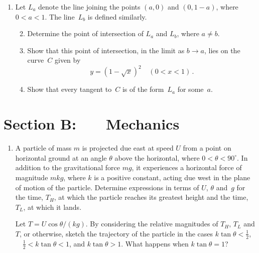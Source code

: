 \documentclass[a4, 11pt]{report}
\newlength{\qspace}
\newcounter{qnumber}
\newenvironment{question}%
 {\vspace{\qspace}
  \begin{enumerate}[\bfseries 1\quad][10]%
    \setcounter{enumi}{\value{qnumber}}%
    \item%
 }
{
  \end{enumerate}
  \filbreak
  \stepcounter{qnumber}
 }
\newenvironment{questionparts}[1][1]%
 {
  \begin{enumerate}[\bfseries (i)]%
    \setcounter{enumii}{#1}
    \addtocounter{enumii}{-1}
    \setlength{\itemsep}{5mm}
    \setlength{\parskip}{8pt}
 }
 {
  \end{enumerate}
 }
\renewcommand{\.}[1]{\ensuremath{\mathrm{#1}}}
\newcommand{\+}[1]{\ensuremath{\mathbf{#1}}}
\begin{document}
\begin{question}
  Let $L_a$ denote the line joining the points $(a,0)$ and $(0, 1-a)$,
  where $0<   a <   1$.  The line~$L_b$ is defined similarly.
  \begin{questionparts}
  \item Determine the point of intersection of $L_a$ and $L_b$, where
    $a\ne b$.
  \item Show that this point of intersection, in the limit as $b\to
    a$, lies on the curve~$C$ given by
    \[
    y=(1-\sqrt x)^2\, \ \ \ \ (0<   x <   1)\,.
    \]
  \item Show that every tangent
    to~$C$ is of the form~$L_a$ for some~$a$.
  \end{questionparts}
\end{question}	
		

		
	
\newpage
\section*{Section B: \ \ \ Mechanics}


	
\begin{question}

  A particle of mass $m$
  is projected due east at speed $U$ from a point on horizontal
  ground at an angle $\theta$ above the horizontal, where $0<\theta<
  90^\circ$.  In addition to the  gravitational force $mg$, it
  experiences a horizontal  force of magnitude $mkg$, where $k$ is a positive
constant, acting due west
  in the plane of motion of the particle.  Determine expressions in
  terms of $U$, $\theta$ and~$g$ for the time, $T_H$, at which the
  particle reaches its greatest height and the time, $T_L   $, 
at which it
  lands.

  Let $T = U\cos\theta /(kg)$.  By considering the relative
  magnitudes of $T_H$, $T_L   $ and $T$, or otherwise, sketch the
  trajectory of the particle in the cases
$k\tan\theta<\frac12$,  \ \ $\frac12 < k\tan\theta<1$, and $k\tan\theta>1$.
What happens when $k\tan\theta =1$?
	\end{question}
	
\end{document}
